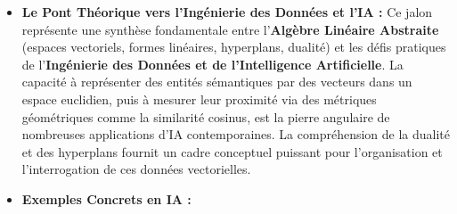 \documentclass[11pt,a4paper]{report}
\begin{document}
\begin{itemize}
\item
  \textbf{Le Pont Théorique vers l'Ingénierie des Données et l'IA :} Ce
  jalon représente une synthèse fondamentale entre l'\textbf{Algèbre
  Linéaire Abstraite} (espaces vectoriels, formes linéaires, hyperplans,
  dualité) et les défis pratiques de l'\textbf{Ingénierie des Données et
  de l'Intelligence Artificielle}. La capacité à représenter des entités
  sémantiques par des vecteurs dans un espace euclidien, puis à mesurer
  leur proximité via des métriques géométriques comme la similarité
  cosinus, est la pierre angulaire de nombreuses applications d'IA
  contemporaines. La compréhension de la dualité et des hyperplans
  fournit un cadre conceptuel puissant pour l'organisation et
  l'interrogation de ces données vectorielles.
\item
  \textbf{Exemples Concrets en IA :}


\end{itemize}
\end{document}
